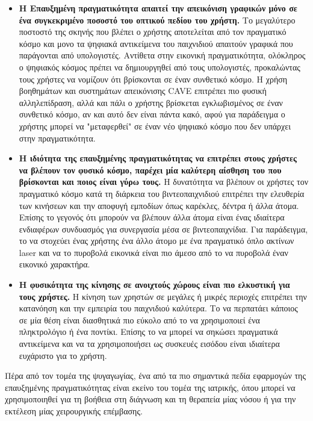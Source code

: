 \begin{itemize}
\item \textbf{Η Επαυξημένη πραγματικότητα απαιτεί την απεικόνιση γραφικών μόνο σε ένα συγκεκριμένο ποσοστό του οπτικού πεδίου του χρήστη.} Το μεγαλύτερο ποστοστό της σκηνής που βλέπει ο χρήστης αποτελείται από τον πραγματικό κόσμο και μονο τα ψηφιακά αντικείμενα του παιχνιδιού απαιτούν γραφικά που παράγονται από υπολογιστές. Αντίθετα στην εικονική πραγματικότητα, ολόκληρος ο ψηφιακός κόσμος πρέπει να δημιουργηθεί από τους υπολογιστές, προκαλώντας τους χρήστες να νομίζουν ότι βρίσκονται σε έναν συνθετικό κόσμο. Η χρήση βοηθημάτων και συστημάτων απεικόνισης CAVE επιτρέπει πιο φυσική αλληλεπίδραση, αλλά και πάλι ο χρήστης βρίσκεται εγκλωβισμένος σε έναν συνθετικό κόσμο, αν και αυτό δεν είναι πάντα κακό, αφού για παράδειγμα ο χρήστης μπορεί να "μεταφερθεί" σε έναν νέο ψηφιακό κόσμο που δεν υπάρχει στην πραγματικότητα.
  
\item \textbf{Η ιδιότητα της επαυξημένης πραγματικότητας να επιτρέπει στους χρήστες να βλέπουν τον φυσικό κόσμο, παρέχει μία καλύτερη αίσθηση του που βρίσκονται και ποιος είναι γύρω τους.} H δυνατότητα να βλέπουν οι χρήστες τον πραγματικό κόσμο κατά τη διάρκεια του βιντεοπαιχνιδιού επιτρέπει την ελευθερία των κινήσεων και την αποφυγή εμποδίων όπως καρέκλες, δέντρα ή άλλα άτομα. Επίσης το γεγονός ότι μπορούν να βλέπουν άλλα άτομα είναι ένας ιδιαίτερα ενδιαφέρων συνδυασμός για συνεργασία μέσα σε βιντεοπαιχνίδια. Για παράδειγμα, το να στοχεύει ένας χρήστης ένα άλλο άτομο με ένα πραγματικό όπλο ακτίνων laser και να το πυροβολά εικονικά είναι πιο άμεσο από το να πυροβολά έναν εικονικό χαρακτήρα. 
  
\item \textbf{Η φυσικότητα της κίνησης σε ανοιχτούς χώρους είναι πιο ελκυστική για τους χρήστες.} Η κίνηση των χρηστών σε μεγάλες ή μικρές περιοχές επιτρέπει την κατανόηση και την εμπειρία του παιχνιδιού καλύτερα. Το να περπατάει κάποιος σε μία θέση είναι διασθητικά πιο εύκολο από το να χρησιμοποιεί ένα πληκτρολόγιο ή ένα ποντίκι. Επίσης το να μπορεί να σηκώσει πραγματικά αντικείμενα και να τα χρησιμοποιήσει ως συσκευές εισόδου είναι ιδιαίτερα ευχάριστο για το χρήστη.
\end{itemize}

  



Πέρα από τον τομέα της ψυγαγωγίας, ένα από τα πιο σημαντικά πεδία εφαρμογών της επαυξημένης πραγματικότητας είναι εκείνο του τομέα της ιατρικής, όπου  μπορεί να χρησιμοποιηθεί για τη βοήθεια στη διάγνωση και τη θεραπεία μίας νόσου ή για την εκτέλεση μίας χειρουργικής επέμβασης. 

